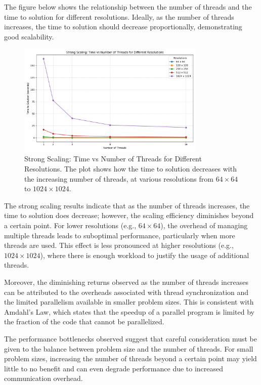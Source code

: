 \documentclass[unicode,11pt,a4paper,oneside,numbers=endperiod,openany]{scrartcl}
\begin{document}
The figure below shows the relationship between the number of threads and the time to solution for different resolutions. Ideally, as the number of threads increases, the time to solution should decrease proportionally, demonstrating good scalability.

\begin{figure}[h]
    \centering
    \includegraphics[width=0.8\textwidth]{pictures/strong_scaling_plot.png}
    \caption{Strong Scaling: Time vs Number of Threads for Different Resolutions. The plot shows how the time to solution decreases with the increasing number of threads, at various resolutions from $64 \times 64$ to $1024 \times 1024$.}
\end{figure}

The strong scaling results indicate that as the number of threads increases, the time to solution does decrease; however, the scaling efficiency diminishes beyond a certain point. For lower resolutions (e.g., $64 \times 64$), the overhead of managing multiple threads leads to suboptimal performance, particularly when more threads are used. This effect is less pronounced at higher resolutions (e.g., $1024 \times 1024$), where there is enough workload to justify the usage of additional threads.

Moreover, the diminishing returns observed as the number of threads increases can be attributed to the overheads associated with thread synchronization and the limited parallelism available in smaller problem sizes. This is consistent with Amdahl's Law, which states that the speedup of a parallel program is limited by the fraction of the code that cannot be parallelized.

The performance bottlenecks observed suggest that careful consideration must be given to the balance between problem size and the number of threads. For small problem sizes, increasing the number of threads beyond a certain point may yield little to no benefit and can even degrade performance due to increased communication overhead.
\end{document}
